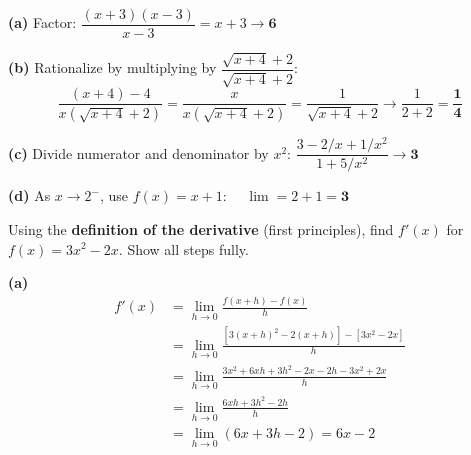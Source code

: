 \documentclass[addpoints]{exam}
\begin{document}
\begin{questions}
\begin{solution}[9cm]
\textbf{(a)} Factor: $\dfrac{(x+3)(x-3)}{x-3} = x + 3 \to \mathbf{6}$

\textbf{(b)} Rationalize by multiplying by $\dfrac{\sqrt{x+4}+2}{\sqrt{x+4}+2}$:
\[
\frac{(x+4) - 4}{x(\sqrt{x+4}+2)} = \frac{x}{x(\sqrt{x+4}+2)} = \frac{1}{\sqrt{x+4}+2}
\to \frac{1}{2+2} = \mathbf{\frac{1}{4}}
\]

\textbf{(c)} Divide numerator and denominator by $x^2$:
$\dfrac{3 - 2/x + 1/x^2}{1 + 5/x^2} \to \mathbf{3}$

\textbf{(d)} As $x \to 2^-$, use $f(x) = x + 1$: $\quad \lim = 2 + 1 = \mathbf{3}$
\end{solution}

\question Using the \textbf{definition of the derivative} (first principles), find $f'(x)$ for
$f(x) = 3x^2 - 2x$. Show all steps fully.
\begin{solution}[9cm]
\textbf{(a)}
\begin{align*}
f'(x) &= \lim_{h \to 0} \frac{f(x+h) - f(x)}{h} \\
&= \lim_{h \to 0} \frac{[3(x+h)^2 - 2(x+h)] - [3x^2 - 2x]}{h} \\
&= \lim_{h \to 0} \frac{3x^2 + 6xh + 3h^2 - 2x - 2h - 3x^2 + 2x}{h} \\
&= \lim_{h \to 0} \frac{6xh + 3h^2 - 2h}{h} \\
&= \lim_{h \to 0} (6x + 3h - 2) = \boxed{6x - 2}
\end{align*}


\end{solution}
\end{questions}
\end{document}
